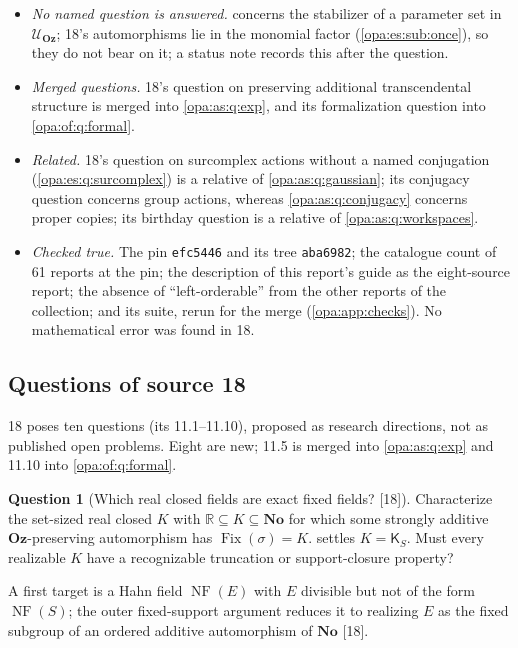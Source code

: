 \documentclass[11pt,oneside]{article}
\numberwithin{equation}{section}
\theoremstyle{definition}
\newtheorem{question}[question]{Question}
\theoremstyle{remark}
\newcommand{\No}{\mathbf{No}}
\newcommand{\Oz}{\mathbf{Oz}}
\newcommand{\R}{\mathbb R}
\newcommand{\UU}{\mathcal U}
\newcommand{\Fix}{\operatorname{Fix}}
\newcommand{\src}[1]{\textup{\textsf{\small[#1]}}}
\newcommand{\NF}{\operatorname{NF}}
\begin{document}
\begin{itemize}[itemsep=2pt]
\item \emph{No named question is answered.}  concerns the stabilizer of a parameter set in $\UU_\Oz$; 18's automorphisms lie in
the monomial factor (\cref{opa:es:sub:once}), so they do not bear on it; a status note records this after the question.
\item \emph{Merged questions.} 18's question on preserving additional transcendental structure is merged into \cref{opa:as:q:exp}, and its
formalization question into \cref{opa:of:q:formal}.
\item \emph{Related.} 18's question on surcomplex actions without a named conjugation (\cref{opa:es:q:surcomplex}) is a relative of
\cref{opa:as:q:gaussian}; its conjugacy question concerns group actions, whereas \cref{opa:as:q:conjugacy} concerns proper copies; its birthday
question is a relative of \cref{opa:as:q:workspaces}.
\item \emph{Checked true.} The pin \texttt{efc5446} and its tree \texttt{aba6982}; the catalogue count of 61 reports at the pin; the
description of this report's guide as the eight-source report; the absence of ``left-orderable'' from the other reports of the collection; and its suite,
rerun for the merge (\cref{opa:app:checks}). No mathematical error was found in 18.
\end{itemize}

\subsection{Questions of source 18}\label{opa:es:sub:questions}

18 poses ten questions (its 11.1--11.10), proposed as research directions, not as published open problems. Eight are new; 11.5 is merged
into \cref{opa:as:q:exp} and 11.10 into \cref{opa:of:q:formal}.

\begin{question}[Which real closed fields are exact fixed fields? \src{18}]\label{opa:es:q:fixedfields}
Characterize the set-sized real closed $K$ with $\R\subseteq K\subseteq\No$ for which some strongly additive $\Oz$-preserving automorphism has
$\Fix(\sigma)=K$.  settles $K=\mathsf K_S$. Must every realizable $K$ have a recognizable truncation or support-closure
property?
\end{question}
A first target is a Hahn field $\NF(E)$ with $E$ divisible but not of the form $\NF(S)$; the outer fixed-support argument reduces it to
realizing $E$ as the fixed subgroup of an ordered additive automorphism of $\No$ \src{18}.
\end{document}
